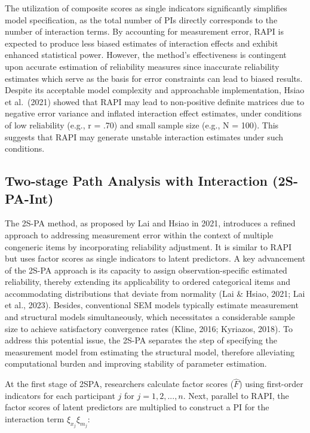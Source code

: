 \documentclass[
  man]{apa6}
\begin{document}
The utilization of composite scores as single indicators significantly simplifies model specification, as the total number of PIs directly corresponds to the number of interaction terms. By accounting for measurement error, RAPI is expected to produce less biased estimates of interaction effects and exhibit enhanced statistical power. However, the method's effectiveness is contingent upon accurate estimation of reliability measures since inaccurate reliability estimates which serve as the basis for error constraints can lead to biased results. Despite its acceptable model complexity and approachable implementation, Hsiao et al.~(2021) showed that RAPI may lead to non-positive definite matrices due to negative error variance and inflated interaction effect estimates, under conditions of low reliability (e.g., r = .70) and small sample size (e.g., N = 100). This suggests that RAPI may generate unstable interaction estimates under such conditions.

\hypertarget{two-stage-path-analysis-with-interaction-2s-pa-int}{%
\subsection{Two-stage Path Analysis with Interaction (2S-PA-Int)}\label{two-stage-path-analysis-with-interaction-2s-pa-int}}

The 2S-PA method, as proposed by Lai and Hsiao in 2021, introduces a refined approach to addressing measurement error within the context of multiple congeneric items by incorporating reliability adjustment. It is similar to RAPI but uses factor scores as single indicators to latent predictors. A key advancement of the 2S-PA approach is its capacity to assign observation-specific estimated reliability, thereby extending its applicability to ordered categorical items and accommodating distributions that deviate from normality (Lai \& Hsiao, 2021; Lai et al., 2023). Besides, conventional SEM models typically estimate measurement and structural models simultaneously, which necessitates a considerable sample size to achieve satisfactory convergence rates (Kline, 2016; Kyriazos, 2018). To address this potential issue, the 2S-PA separates the step of specifying the measurement model from estimating the structural model, therefore alleviating computational burden and improving stability of parameter estimation.

At the first stage of 2SPA, researchers calculate factor scores (\(\hat{F}\)) using first-order indicators for each participant \(j\) for \(j = 1, 2, ..., n\). Next, parallel to RAPI, the factor scores of latent predictors are multiplied to construct a PI for the interaction term \(\xi_{x_{j}}\xi_{m_{j}}\):
\end{document}
